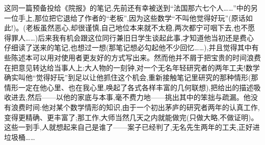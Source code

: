 这同一篇预备投给《院报》的笔记,先前还有幸被送到“法国那六七个人……”中的另一位手上,那位把它退给了作者的“老板”,因为这些数学“不叫他觉得好玩”(原话如此!)。(老板虽然恶心,却很谨慎,自己地位本来就不太稳,两次都宁可咽下去,也不愿得罪人……)后来我有机会跟这位同行兼旧日学生谈起此事,才知道他当初还是费心仔细读了送来的笔记,也想过一想(那笔记想必勾起他不少回忆……),并且觉得其中有些陈述本可以用对使用者更友好的方式写出来。然而他并不屑于把宝贵的时间浪费在把意见转达给当事人上:大人物的一刻钟,对一个无名年轻研究者的两年工夫!数学确实叫他“觉得好玩”到足以让他抓住这个机会,重新接触笔记里研究的那种情形(那情形一定在他心里、也在我心里,唤起了各式各样丰富的几何联想),把给出的描述吸收进去,然后——以他的家底与本事,毫不费力地——挑出其中的笨拙与疏漏。他没有浪费时间:他对某个数学情形的知识,由于一个初出茅庐的研究者两年的认真工作,变得更精确、更丰富了;那工作,大师当然几天之内就能做完(只做大略,不做证明)。这些一到手,人就想起来自己是谁了——案子已经判了,无名先生两年的工夫,正好进垃圾桶……

